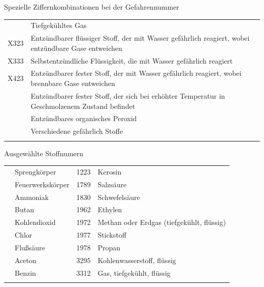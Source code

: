 \Table
{Spezielle Ziffernkombinationen bei der
Gefahrennummer}%
{}%
{\label{tab:gefahrennummer-spezielle-ziffernkombinationen}}%
{}%
{}%
{%
\begin{tabulary}{\linewidth}{cL}
\addlinespace\toprule{} & Tiefgekühltes Gas
\\\addlinespace
X323 & Entzündbarer flüssiger Stoff, der mit Wasser gefährlich reagiert, wobei entzündbare Gase entweichen
\\\addlinespace
X333 & Selbstentzündliche Flüssigkeit, die mit Wasser gefährlich reagiert
\\\addlinespace
X423 & Entzündbarer fester Stoff, der mit Wasser gefährlich reagiert, wobei brennbare Gase entweichen
\\ & Entzündbarer fester Stoff, der sich bei erhöhter Temperatur in Geschmolzenem Zustand befindet
\\ & Entzündbares organisches Peroxid
\\  & Verschiedene gefährlich Stoffe
\\\addlinespace\bottomrule
\end{tabulary}
}%
{}%







\Table
{Ausgewählte Stoffnumern}%
{}%
{}%
{}%
{}%
{%
\begin{tabulary}{\linewidth}{cLcL}
\toprule{} & Sprengkörper & 1223 & Kerosin
\\ & Feuerwerkskörper & 1789 & Salzsäure
\\ & Ammoniak & 1830 & Schwefelsäure
\\ & Butan & 1962 & Ethylen
\\ & Kohlendioxid & 1972 & Methan oder Erdgas (tiefgekühlt, flüssig)
\\ & Chlor & 1977 & Stickstoff
\\ & Flußsäure & 1978 & Propan
\\ & Aceton & 3295 & Kohlenwasserstoff, flüssig
\\ & Benzin & 3312 & Gas, tiefgekühlt, flüssig
\\\addlinespace\bottomrule
\end{tabulary}
}%
{}%






